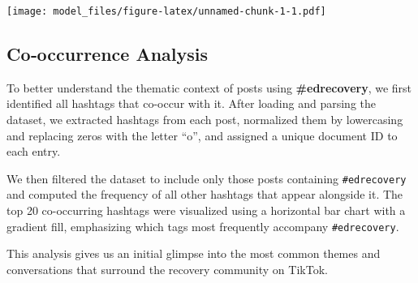 \documentclass[
]{article}
\begin{document}
\texttt{[image: model\_files/figure-latex/unnamed-chunk-1-1.pdf]}

\subsection{Co‑occurrence Analysis}\label{cooccurrence-analysis}

To better understand the thematic context of posts using
\textbf{\#edrecovery}, we first identified all hashtags that co-occur
with it. After loading and parsing the dataset, we extracted hashtags
from each post, normalized them by lowercasing and replacing zeros with
the letter ``o'', and assigned a unique document ID to each entry.

We then filtered the dataset to include only those posts containing
\texttt{\#edrecovery} and computed the frequency of all other hashtags
that appear alongside it. The top 20 co-occurring hashtags were
visualized using a horizontal bar chart with a gradient fill,
emphasizing which tags most frequently accompany \texttt{\#edrecovery}.

This analysis gives us an initial glimpse into the most common themes
and conversations that surround the recovery community on TikTok.
\end{document}
